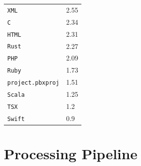 \documentclass[10pt]{article} %
\begin{document}
\begin{table}
\begin{adjustbox}{valign=t}
\begin{minipage}[t]{0.45\textwidth}
\begin{tabular}{ll}
\verb|XML| & 2.55  \\ 
\verb|C| & 2.34  \\ 
\verb|HTML| & 2.31  \\ 
\verb|Rust| & 2.27  \\ 
\verb|PHP| & 2.09  \\ 
\verb|Ruby| & 1.73  \\ 
\verb|project.pbxproj| & 1.51  \\ 
\verb|Scala| & 1.25  \\ 
\verb|TSX| & 1.2  \\ 
\verb|Swift| & 0.9  \\ 
\bottomrule
\end{tabular}
\end{minipage}
\end{adjustbox}
\end{table}

\section{Processing Pipeline}
\end{document}
